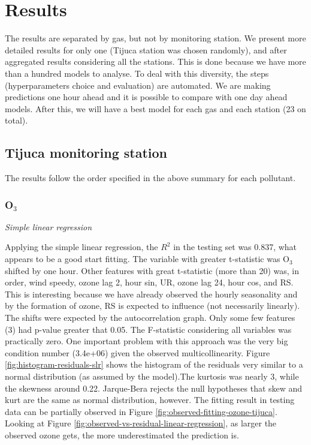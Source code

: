 \section{Results}
\label{sec:results}

The results are separated by gas, but not by monitoring station. We present
more detailed results for only one (Tijuca station was chosen randomly), and after aggregated results
considering all the stations. This is done because we have more than
a hundred models to analyse. To deal with this diversity, the steps
(hyperparameters choice and evaluation) are automated. We are
making predictions one hour ahead and it is possible to compare with one day
ahead models. After this, we will have a best model for each gas and each
station (23 on total). 

\subsection{Tijuca monitoring station}

The results follow the order specified in the above summary for each pollutant. 

\subsubsection{O\texorpdfstring{$_3$}{3}}

{\em Simple linear regression}

\vspace{2mm}

Applying the simple linear regression, the $R^2$ in the testing set was 0.837,
what appears to be a good start fitting. The variable with greater t-statistic
was O$_3$ shifted by one hour. Other features with great t-statistic (more than
20) was, in
order, wind speedy, ozone lag 2, hour sin, UR, ozone lag 24, hour cos, and RS.
This is interesting because we have already observed the hourly seasonality
and by the formation of ozone, RS is expected to influence (not necessarily
linearly). The shifts were expected by the autocorrelation graph. Only some few features (3) had p-value greater that 0.05. The
F-statistic considering all variables was practically zero. One important
problem with this approach was the very big condition number (3.4e+06) given
the observed multicollinearity. Figure \ref{fig:histogram-residuals-slr} shows
the histogram of the residuals very similar to a normal distribution (as
assumed by the model).The kurtosis was nearly 3, while the skewness around
0.22. Jarque-Bera rejects the null hypotheses that skew and kurt are the same
as normal distribution, however.  The fitting result in testing data can be
partially observed in Figure \ref{fig:observed-fitting-ozone-tijuca}. Looking
at Figure  \ref{fig:observed-vs-residual-linear-regression}, as larger the
observed ozone gets, the more underestimated the prediction is.

